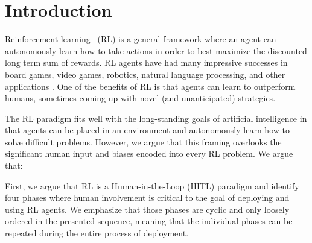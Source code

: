 \documentclass[twoside,11pt]{article}
\begin{document}
\section{Introduction}
\label{sec:introduction}

%


Reinforcement learning~\citep{SuttonBarto:2018:RLIntroduction} (RL) is a general framework where an agent can autonomously learn how to take actions in order to best maximize the discounted long term sum of rewards. RL agents have had many impressive successes in board games, video games, robotics, natural language processing, and other applications \citep{Li:2017:DRLSurvey}. One of the benefits of RL is that agents can learn to outperform humans, sometimes coming up with novel (and unanticipated) strategies.

The RL paradigm fits well with the long-standing goals of artificial intelligence in that agents can be placed in an environment and autonomously learn how to solve difficult problems. However, we argue that this framing overlooks the significant human input and biases encoded into every RL problem. We argue that: 
\begin{center}
\end{center}

First, we argue that RL is a Human-in-the-Loop (HITL) paradigm and identify four phases where human involvement is critical to the goal of deploying and using RL agents. We emphasize that those phases are cyclic and only loosely ordered in the presented sequence, meaning that the individual phases can be repeated during the entire process of deployment.
\end{document}
